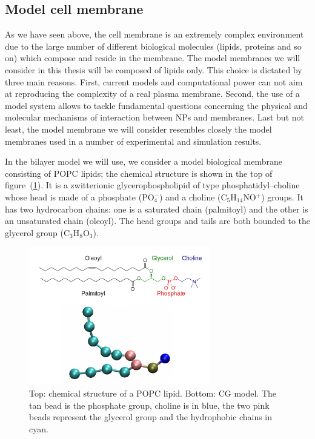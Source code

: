 \subsection{Model cell membrane}
As we have seen above, the cell membrane is an extremely complex environment due to the large number of different 
biological molecules (lipids, proteins and so on) which compose and reside in the membrane. The model membranes we 
will consider in this thesis will be composed of lipids only. This choice is dictated by three main reasons. 
First, current models and computational power can not aim at reproducing the complexity of a real plasma membrane. 
Second, the use of a model system allows to tackle fundamental questions concerning the physical and molecular 
mechanisms of interaction between \acp{NP} and membranes. Last but not least, the model membrane we will consider 
resembles closely the model membranes used in a number of experimental and simulation results.  

In the bilayer model we will use, we consider a model biological membrane consisting of \ac{POPC} lipids; the 
chemical structure is shown in the top of figure~(\ref{fig:popc}). It is a zwitterionic glycerophospholipid of 
type phosphatidyl--choline whose head is made of a phosphate (PO$_4^-$) and a choline (C$_5$H$_{14}$NO$^+$) 
groups. It has two hydrocarbon chains: one is a saturated chain (palmitoyl) and the other is an unsaturated chain 
(oleoyl). The head groups and tails are both bounded to the glycerol group (C$_3$H$_8$O$_3$).
\begin{figure}[!ht]
	\centering
	\includegraphics[width=0.7\textwidth]{./img/POPC/popc}
	\caption{Top: chemical structure of a \acs{POPC} lipid. Bottom: \martini{} \acs{CG} model. The tan bead is the phosphate group, choline is in blue, the two pink beads represent the glycerol group and the hydrophobic chains in cyan.}%
	\label{fig:popc}
\end{figure}

